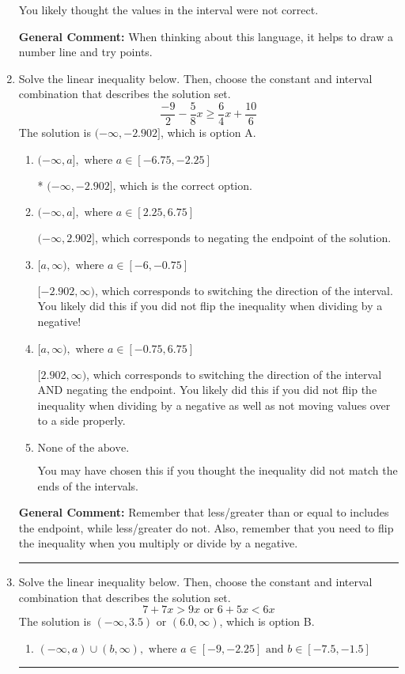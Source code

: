 \documentclass{extbook}[14pt]
\newcommand{\litem}[1]{\item #1

\rule{\textwidth}{0.4pt}}
\begin{document}
\begin{enumerate}
{\begin{enumerate}[label=\Alph*.]
You likely thought the values in the interval were not correct.
\end{enumerate}

\textbf{General Comment:} When thinking about this language, it helps to draw a number line and try points.
}
\litem{
Solve the linear inequality below. Then, choose the constant and interval combination that describes the solution set.
\[ \frac{-9}{2} - \frac{5}{8} x \geq \frac{6}{4} x + \frac{10}{6} \]The solution is \( (-\infty, -2.902] \), which is option A.\begin{enumerate}[label=\Alph*.]
\item \( (-\infty, a], \text{ where } a \in [-6.75, -2.25] \)

* $(-\infty, -2.902]$, which is the correct option.
\item \( (-\infty, a], \text{ where } a \in [2.25, 6.75] \)

 $(-\infty, 2.902]$, which corresponds to negating the endpoint of the solution.
\item \( [a, \infty), \text{ where } a \in [-6, -0.75] \)

 $[-2.902, \infty)$, which corresponds to switching the direction of the interval. You likely did this if you did not flip the inequality when dividing by a negative!
\item \( [a, \infty), \text{ where } a \in [-0.75, 6.75] \)

 $[2.902, \infty)$, which corresponds to switching the direction of the interval AND negating the endpoint. You likely did this if you did not flip the inequality when dividing by a negative as well as not moving values over to a side properly.
\item \( \text{None of the above}. \)

You may have chosen this if you thought the inequality did not match the ends of the intervals.
\end{enumerate}

\textbf{General Comment:} Remember that less/greater than or equal to includes the endpoint, while less/greater do not. Also, remember that you need to flip the inequality when you multiply or divide by a negative.
}
\litem{
Solve the linear inequality below. Then, choose the constant and interval combination that describes the solution set.
\[ 7 + 7 x > 9 x \text{ or } 6 + 5 x < 6 x \]The solution is \( (-\infty, 3.5) \text{ or } (6.0, \infty) \), which is option B.\begin{enumerate}[label=\Alph*.]
\item \( (-\infty, a) \cup (b, \infty), \text{ where } a \in [-9, -2.25] \text{ and } b \in [-7.5, -1.5] \)


\end{enumerate}}
\end{enumerate}
\end{document}

